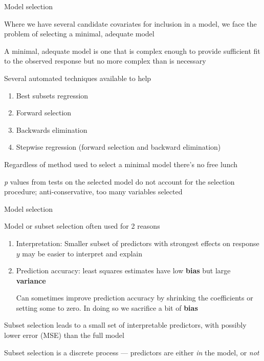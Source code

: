 \documentclass[10pt,ignorenonframetext,compress, aspectratio=169]{beamer}
\providecommand{\tightlist}{%
  \setlength{\itemsep}{0pt}\setlength{\parskip}{0pt}}
\begin{document}
\begin{frame}{Model selection}

Where we have several candidate covariates for inclusion in a model, we
face the problem of selecting a \alert{minimal, adequate model}

A minimal, adequate model is one that is complex enough to provide
sufficient fit to the observed response but no more complex than is
necessary

Several automated techniques available to help

\small

\begin{enumerate}
\def\labelenumi{\arabic{enumi}.}
\tightlist
\item
  Best subsets regression
\item
  Forward selection
\item
  Backwards elimination
\item
  Stepwise regression (forward selection and backward elimination)
\end{enumerate}

\normalsize

Regardless of method used to select a minimal model there's no free
lunch

\emph{p} values from tests on the selected model do not account for the
selection procedure; anti-conservative, too many variables selected

\end{frame}

\begin{frame}{Model selection}

Model or subset selection often used for 2 reasons

\begin{enumerate}
\def\labelenumi{\arabic{enumi}.}
\item
  \alert{Interpretation}: Smaller subset of predictors with strongest
  effects on response \(y\) may be easier to interpret and explain
\item
  \alert{Prediction accuracy}: least squares estimates have low
  \textbf{bias} but large \textbf{variance}

  Can sometimes improve prediction accuracy by shrinking the
  coefficients or setting some to zero. In doing so we sacrifice a bit
  of \textbf{bias}
\end{enumerate}

Subset selection leads to a small set of interpretable predictors, with
possibly lower error (MSE) than the full model

Subset selection is a discrete process --- predictors are either
\emph{in} the model, or \emph{not}

\end{frame}
\end{document}
